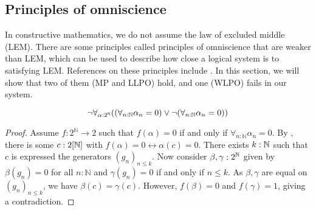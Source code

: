 \subsection{Principles of omniscience}
In constructive mathematics, we do not assume the law of excluded middle (LEM).
There are some principles called principles of omniscience that are weaker than LEM, which can be used to describe 
how close a logical system is to satisfying LEM.
References on these principles include \cite{HannesDiener, ReverseMathsBishop}.
In this section, we will show that two of them (MP and LLPO) hold, 
and one (WLPO) fails in our system.

\begin{theorem}\label{NotWLPO}
  \[
    \neg \forall_{\alpha:2^{\mathbb{N}}} 
    ((\forall_{n:\mathbb{N}} \alpha_n = 0 ) \vee \neg (\forall_{n:\mathbb{N}} \alpha_n = 0))
  \]
\end{theorem}
\begin{proof}
  Assume $f:2^\mathbb N \to 2$ such that 
  $f(\alpha) = 0$ if and only if $\forall_{n:\mathbb N} \alpha_n= 0$. 
  By , there is some $c:2[\mathbb{N}]$ with 
  $f(\alpha) = 0 \leftrightarrow \alpha(c) = 0$. 
  There exists $k:\mathbb{N}$ such that $c$ is expressed the generators $(g_n)_{n\leq k}$. 
  Now consider $\beta,\gamma:2^{\mathbb{N}}$ given by 
  $\beta(g_n) = 0$ for all $n:\mathbb N$ and
  $\gamma(g_n) = 0$ if and only if $n\leq k$. 
  As $\beta, \gamma$ are equal on $(g_n)_{n\leq k}$, we have $\beta(c) = \gamma(c)$. 
  However, $f(\beta) = 0$ and $f(\gamma) = 1$, giving a contradiction. 
\end{proof}

